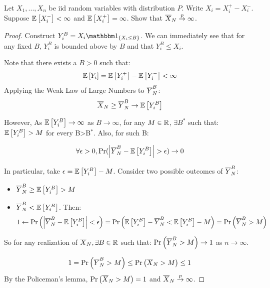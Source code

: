 \documentclass[12pt, letterpaper]{paper}
\begin{document}
\begin{question}
  Let $X_1, ..., X_n$ be iid random variables with distribution
  $P$. Write $X_i = X_i^+ - X_i^-.$ Suppose $\mathbb{E} \left [ X_i^- \right ] < \infty$ and
  $\mathbb{E} \left [ X_i^+ \right ] = \infty$. Show that $\overline{ X }_{N} \overset{p}{\to} \infty$.

  \begin{proof}
    Construct $Y_i^B = X_i \indicate{X_i \leq B}$. We can immediately see
    that for any fixed $B$, $Y_i^B$ is bounded above by $B$ and that
    $Y_i^B \leq X_i$.

    \vspace{.15in}

    Note that there exists a $B > 0$ such that:
    \begin{equation*}
      \mathbb{E} \left [ Y_i \right ] = \mathbb{E} \left [ Y_i^+ \right ] - \mathbb{E} \left [ Y_i^- \right ] < \infty
    \end{equation*}
    Applying the Weak Law of Large Numbers to $\overline{ Y }_{N}^B$:
    \begin{equation*}
      \overline{ X }_{N} \geq \overline{ Y }_{N}^B \to \mathbb{E} \left [ Y_i^B \right ] 
    \end{equation*}

    However, As $\mathbb{E} \left [ Y_i^B \right ] \to \infty$ as
    $B \to \infty$, for any $M \in \mathbb{R}$, $\exists B^{*}$ such that: $\mathbb{E} \left [ Y_i^B \right ] >
    M$ for every B>B$^{*}$. Also, for such B:  

    \begin{equation*}
      \forall \epsilon > 0, \Pr( \left \lvert \overline{ Y }_{N}^B - \mathbb{E} \left [ Y_i^B \right ] \right \rvert > \epsilon) \to 0  
    \end{equation*}
    
    In particular, take $\epsilon = \mathbb{E} \left [ Y_i^B \right ] - M$.  Consider two possible
    outcomes of $\overline{ Y }_{N}^B$:
    \begin{itemize}
    \item $\overline{ Y }_{N}^B \geq \mathbb{E} \left [ Y_i^B \right ] > M$
    \item $\overline{ Y }_{N}^B < \mathbb{E} \left [ Y_i^B \right ]$. Then:
      \begin{align*}
        1 \leftarrow \Pr\left(\left \lvert  \overline{ Y }_{N}^B - \mathbb{E} \left [ Y_i^B \right ] \right \rvert < \epsilon \right) = \Pr\left( \mathbb{E} \left [ Y_i^B \right ] - \overline{ Y }_{N}^B
        < \mathbb{E} \left [ Y_i^B \right ] - M
        \right) = \Pr\left( \overline{ Y }_{N}^B > M \right)\\  
      \end{align*}
    \end{itemize}
    So for any realization of $\overline{ X }_{N}, \exists B \in \mathbb{R}$ such that:
    $\Pr \left( \overline{ Y }_{N}^B > M \right ) \rightarrow 1$ as $n \rightarrow \infty$.

    \begin{align*}
      1 = \Pr \left(  \overline{ Y }_{N}^B > M  \right ) \leq \Pr \left(  \overline{ X }_{N} > M \right ) \leq 1
    \end{align*}
    By the Policeman's lemma, $\Pr \left( \overline{ X }_{N} > M \right ) = 1$
    and $\overline{ X }_{N} \overset{p}{\to} \infty$.
  \end{proof}
\end{question}
\end{document}
